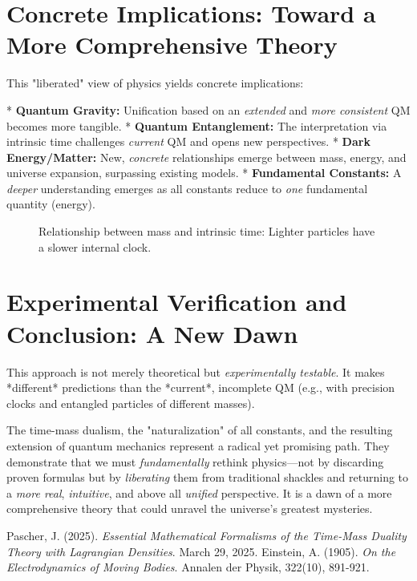 \documentclass[a4paper,12pt]{article}
\begin{document}
	\section{Concrete Implications: Toward a More Comprehensive Theory}
	This "liberated" view of physics yields concrete implications:
	
	*   \textbf{Quantum Gravity:} Unification based on an \emph{extended} and \emph{more consistent} QM becomes more tangible.
	*   \textbf{Quantum Entanglement:} The interpretation via intrinsic time challenges \emph{current} QM and opens new perspectives.
	*   \textbf{Dark Energy/Matter:} New, \emph{concrete} relationships emerge between mass, energy, and universe expansion, surpassing existing models.
	*   \textbf{Fundamental Constants:} A \emph{deeper} understanding emerges as all constants reduce to \emph{one} fundamental quantity (energy).
	
	\begin{figure}[h]
		\centering
		\caption{Relationship between mass and intrinsic time: Lighter particles have a slower internal clock.}
	\end{figure}
	
	\section{Experimental Verification and Conclusion: A New Dawn}
	This approach is not merely theoretical but \emph{experimentally testable}. It makes *different* predictions than the *current*, incomplete QM (e.g., with precision clocks and entangled particles of different masses).
	
	The time-mass dualism, the "naturalization" of all constants, and the resulting extension of quantum mechanics represent a radical yet promising path. They demonstrate that we must \emph{fundamentally} rethink physics—not by discarding proven formulas but by \emph{liberating} them from traditional shackles and returning to a \emph{more real}, \emph{intuitive}, and above all \emph{unified} perspective. It is a dawn of a more comprehensive theory that could unravel the universe’s greatest mysteries.
	
	
	\begin{thebibliography}{2}
		 Pascher, J. (2025). \textit{Essential Mathematical Formalisms of the Time-Mass Duality Theory with Lagrangian Densities}. March 29, 2025.
		 Einstein, A. (1905). \textit{On the Electrodynamics of Moving Bodies}. Annalen der Physik, 322(10), 891-921.
	\end{thebibliography}
	
\end{document}
